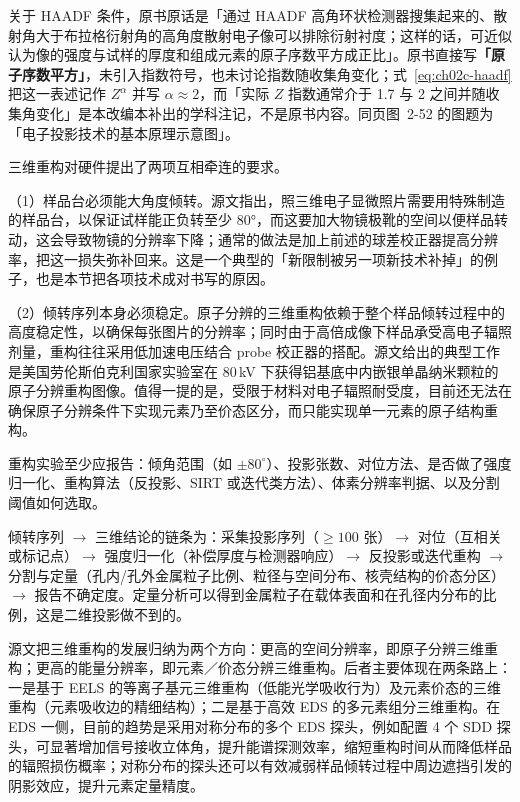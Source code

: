 关于 HAADF 条件，原书原话是「通过 HAADF 高角环状检测器搜集起来的、散射角大于布拉格衍射角的高角度散射电子像可以排除衍射衬度；这样的话，可近似认为像的强度与试样的厚度和组成元素的原子序数平方成正比」。原书直接写\textbf{「原子序数平方」}，未引入指数符号，也未讨论指数随收集角变化；式~\eqref{eq:ch02c-haadf} 把这一表述记作 $Z^{\alpha}$ 并写 $\alpha\approx 2$，而「实际 $Z$ 指数通常介于 1.7 与 2 之间并随收集角变化」是本改编本补出的学科注记，不是原书内容。同页图~2-52 的图题为「电子投影技术的基本原理示意图」。

\begin{measure}
三维重构对硬件提出了两项互相牵连的要求。

（1）样品台必须能大角度倾转。源文指出，照三维电子显微照片需要用特殊制造的样品台，以保证试样能正负转至少 80°，而这要加大物镜极靴的空间以便样品转动，这会导致物镜的分辨率下降；通常的做法是加上前述的球差校正器提高分辨率，把这一损失弥补回来。这是一个典型的「新限制被另一项新技术补掉」的例子，也是本节把各项技术成对书写的原因。

（2）倾转序列本身必须稳定。原子分辨的三维重构依赖于整个样品倾转过程中的高度稳定性，以确保每张图片的分辨率；同时由于高倍成像下样品承受高电子辐照剂量，重构往往采用低加速电压结合 probe 校正器的搭配。源文给出的典型工作是美国劳伦斯伯克利国家实验室在 80\,kV 下获得铝基底中内嵌银单晶纳米颗粒的原子分辨重构图像。值得一提的是，受限于材料对电子辐照耐受度，目前还无法在确保原子分辨条件下实现元素乃至价态区分，而只能实现单一元素的原子结构重构。

重构实验至少应报告：倾角范围（如 $\pm 80^\circ$）、投影张数、对位方法、是否做了强度归一化、重构算法（反投影、SIRT 或迭代类方法）、体素分辨率判据、以及分割阈值如何选取。
\end{measure}

\begin{dataflow}
倾转序列 $\to$ 三维结论的链条为：采集投影序列（$\geq 100$ 张）$\to$ 对位（互相关或标记点）$\to$ 强度归一化（补偿厚度与检测器响应）$\to$ 反投影或迭代重构 $\to$ 分割与定量（孔内/孔外金属粒子比例、粒径与空间分布、核壳结构的价态分区）$\to$ 报告不确定度。定量分析可以得到金属粒子在载体表面和在孔径内分布的比例，这是二维投影做不到的。
\end{dataflow}

源文把三维重构的发展归纳为两个方向：更高的空间分辨率，即原子分辨三维重构；更高的能量分辨率，即元素／价态分辨三维重构。后者主要体现在两条路上：一是基于 EELS 的等离子基元三维重构（低能光学吸收行为）及元素价态的三维重构（元素吸收边的精细结构）；二是基于高效 EDS 的多元素组分三维重构。在 EDS 一侧，目前的趋势是采用对称分布的多个 EDS 探头，例如配置 4 个 SDD 探头，可显著增加信号接收立体角，提升能谱探测效率，缩短重构时间从而降低样品的辐照损伤概率；对称分布的探头还可以有效减弱样品倾转过程中周边遮挡引发的阴影效应，提升元素定量精度。

